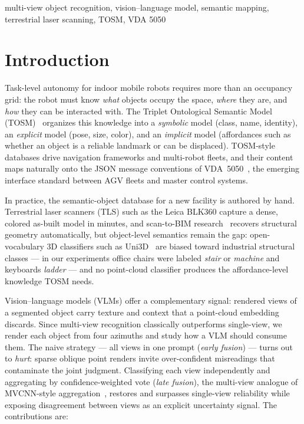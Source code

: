 \documentclass[conference]{IEEEtran}
\begin{document}
\begin{IEEEkeywords}
multi-view object recognition, vision--language model, semantic mapping,
terrestrial laser scanning, TOSM, VDA 5050
\end{IEEEkeywords}

\section{Introduction}
Task-level autonomy for indoor mobile robots requires more than an
occupancy grid: the robot must know \emph{what} objects occupy the space,
\emph{where} they are, and \emph{how} they can be interacted with. The
Triplet Ontological Semantic Model (TOSM)~\cite{joo2020tosm} organizes this
knowledge into a \emph{symbolic} model (class, name, identity), an
\emph{explicit} model (pose, size, color), and an \emph{implicit} model
(affordances such as whether an object is a reliable landmark or can be
displaced). TOSM-style databases drive navigation frameworks and multi-robot
fleets, and their content maps naturally onto the JSON message conventions
of VDA~5050~\cite{vda5050}, the emerging interface standard between AGV
fleets and master control systems.

In practice, the semantic-object database for a new facility is authored by
hand. Terrestrial laser scanners (TLS) such as the Leica BLK360 capture a
dense, colored as-built model in minutes, and scan-to-BIM
research~\cite{patraucean2015} recovers structural geometry automatically,
but object-level semantics remain the gap: open-vocabulary 3D classifiers
such as Uni3D~\cite{zhou2024uni3d} are biased toward industrial structural
classes --- in our experiments office chairs were labeled \emph{stair} or
\emph{machine} and keyboards \emph{ladder} --- and no point-cloud classifier
produces the affordance-level knowledge TOSM needs.

Vision--language models (VLMs) offer a complementary signal: rendered views
of a segmented object carry texture and context that a point-cloud embedding
discards. Since multi-view recognition classically outperforms single-view,
we render each object from four azimuths and study how a VLM should consume
them. The naive strategy --- all views in one prompt (\emph{early fusion})
--- turns out to \emph{hurt}: sparse oblique point renders invite
over-confident misreadings that contaminate the joint judgment. Classifying
each view independently and aggregating by confidence-weighted vote
(\emph{late fusion}), the multi-view analogue of MVCNN-style
aggregation~\cite{su2015mvcnn}, restores and surpasses single-view
reliability while exposing disagreement between views as an explicit
uncertainty signal. The contributions are:
\end{document}
